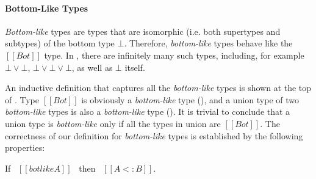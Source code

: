 \paragraph{Bottom-Like Types}
\emph{Bottom-like} types are types that are isomorphic (i.e.
both supertypes and subtypes) of the bottom type $\bot$. Therefore,
\emph{bottom-like} types behave like the $[[Bot]]$ type.
In \name, there
are infinitely many such types, including, for example $\bot \lor \bot$,
$\bot \lor \bot \lor \bot$, as well as $\bot$ itself.

An inductive definition that captures all the \emph{bottom-like} types
is shown at the top of .
Type $[[Bot]]$ is obviously a \emph{bottom-like} type
(), and a union type of two \emph{bottom-like} types is also
a \emph{bottom-like} type ().  It is trivial to conclude
that a union type is \emph{bottom-like} only if all the
types in union are $[[Bot]]$. The correctness of our definition for
\emph{bottom-like} types is established by the following properties:


\begin{lemma}
  If \ $[[botlike A]]$ \ then \ $[[A <: B]]$.
\label{lemma:union:bl-soundness}
\end{lemma}

\begin{comment}
\begin{proof}
  By induction on bottom-like relation.
  \begin{itemize}
    \item All cases are trivial to prove.
  \end{itemize}
\end{proof}
\end{comment}

